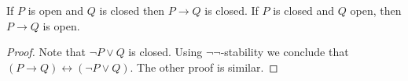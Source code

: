 %
%
\begin{lemma}\label{ImplicationOpenClosed}
  If $P$ is open and $Q$ is closed then $P\to Q$ is closed.
  If $P$ is closed and $Q$ open, then $P\to Q$ is open. 
\end{lemma}
\begin{proof}
  Note that $\neg P \vee Q$ is closed. Using $\neg\neg$-stability
  we conclude that $(P\to Q) \leftrightarrow (\neg P \vee Q)$. 
  The other proof is similar. 
\end{proof}
%

